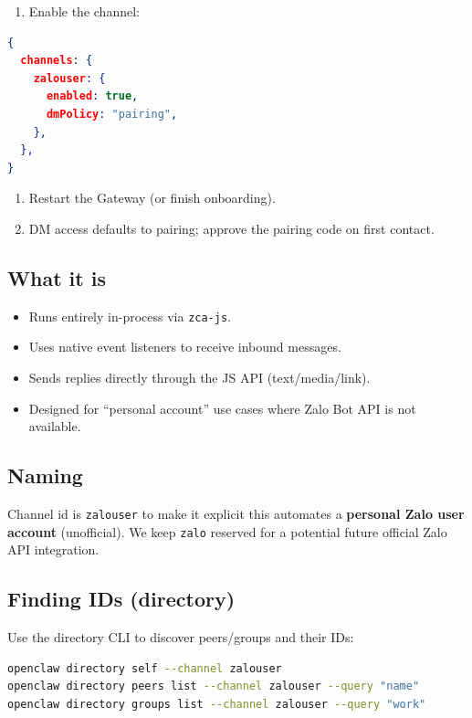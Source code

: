 \begin{enumerate}
  \item Enable the channel:
\end{enumerate}


\begin{lstlisting}[language=json]
{
  channels: {
    zalouser: {
      enabled: true,
      dmPolicy: "pairing",
    },
  },
}
\end{lstlisting}


\begin{enumerate}
  \item Restart the Gateway (or finish onboarding).
  \item DM access defaults to pairing; approve the pairing code on first contact.
\end{enumerate}


\subsection{What it is}


\begin{itemize}
  \item Runs entirely in-process via \texttt{zca-js}.
  \item Uses native event listeners to receive inbound messages.
  \item Sends replies directly through the JS API (text/media/link).
  \item Designed for “personal account” use cases where Zalo Bot API is not available.
\end{itemize}


\subsection{Naming}


Channel id is \texttt{zalouser} to make it explicit this automates a \textbf{personal Zalo user account} (unofficial). We keep \texttt{zalo} reserved for a potential future official Zalo API integration.

\subsection{Finding IDs (directory)}


Use the directory CLI to discover peers/groups and their IDs:

\begin{lstlisting}[language=bash]
openclaw directory self --channel zalouser
openclaw directory peers list --channel zalouser --query "name"
openclaw directory groups list --channel zalouser --query "work"
\end{lstlisting}


